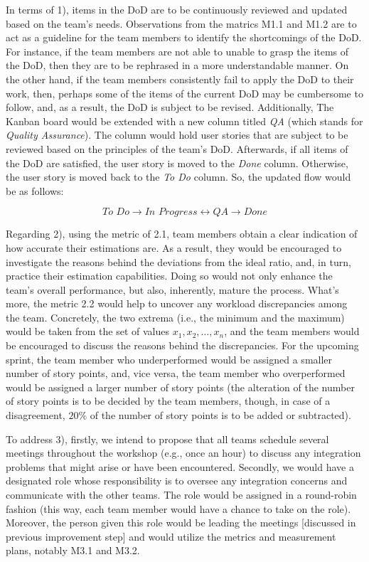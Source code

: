 \documentclass[conference]{IEEEtran}
\begin{document}
In terms of 1), items in the DoD are to be continuously reviewed and updated
based on the team's needs. Observations from the matrics M1.1 and M1.2 are to
act as a guideline for the team members to identify the shortcomings of the
DoD. For instance, if the team members are not able to unable to grasp the
items of the DoD, then they are to be rephrased in a more understandable
manner. On the other hand, if the team members consistently fail to apply the
DoD to their work, then, perhaps some of the items of the current DoD may be
cumbersome to follow, and, as a result, the DoD is subject to be revised.
Additionally, The Kanban board would be extended with a new column titled
\textit{QA} (which stands for \textit{Quality Assurance}). The column would
hold user stories that are subject to be reviewed based on the principles of
the team's DoD. Afterwards, if all items of the DoD are satisfied, the user
story is moved to the \textit{Done} column. Otherwise, the user story is moved
back to the \textit{To Do} column. So, the updated flow would be as follows:

$$\textit{To Do} \to \textit{In Progress} \leftrightarrow \textit{QA} \to
\textit{Done}$$


Regarding 2), using the metric of 2.1, team members obtain a clear indication
of how accurate their estimations are. As a result, they would be encouraged to
investigate the reasons behind the deviations from the ideal ratio, and, in
turn, practice their estimation capabilities. Doing so would not only enhance
the team's overall performance, but also, inherently, mature the process.
What's more, the metric 2.2 would help to uncover any workload discrepancies
among the team. Concretely, the two extrema (i.e., the minimum and the maximum)
would be taken from the set of values $x_1, x_2, \dots, x_n$, and the team
members would be encouraged to discuss the reasons behind the discrepancies.
For the upcoming sprint, the team member who underperformed would be assigned a
smaller number of story points, and, vice versa, the team member who
overperformed would be assigned a larger number of story points (the alteration
of the number of story points is to be decided by the team members, though, in
case of a disagreement, $20\%$ of the number of story points is to be added or
subtracted).

To address 3), firstly, we intend to propose that all teams schedule several
meetings throughout the workshop (e.g., once an hour) to discuss any
integration problems that might arise or have been encountered. Secondly, we
would have a designated role whose responsibility is to oversee any integration
concerns and communicate with the other teams. The role would be assigned in a
round-robin fashion (this way, each team member would have a chance to take on
the role). Moreover, the person given this role would be leading the meetings
[discussed in previous improvement step] and would utilize the metrics and
measurement plans, notably M3.1 and M3.2.
\end{document}
